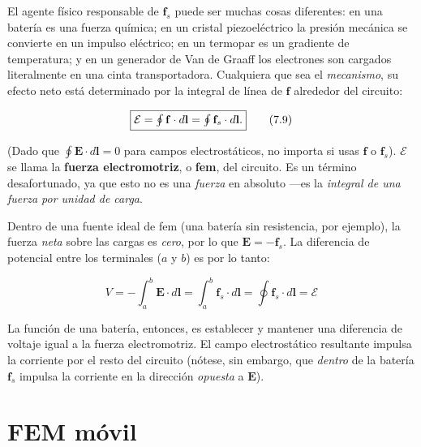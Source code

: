 \documentclass[12pt,a4paper]{report}
\newcommand{\esp}{\vspace{0.5cm}}
\begin{document}
	\esp
	
	El agente físico responsable de $\mathbf{f}_s$ puede ser muchas cosas diferentes: en una batería es una fuerza química; en un cristal piezoeléctrico la presión mecánica se convierte en un impulso eléctrico; en un termopar es un gradiente de temperatura; y en un generador de Van de Graaff los electrones son cargados literalmente en una cinta transportadora. Cualquiera que sea el \textit{mecanismo}, su efecto neto está determinado por la integral de línea de $\mathbf{f}$ alrededor del circuito:
	
	\esp
	
	\begin{equation}
		\fbox{$\mathcal{E} = \oint \mathbf{f} \cdot d\mathbf{l} = \oint \mathbf{f}_s \cdot d\mathbf{l}.$} \tag{7.9}
	\end{equation}
	
	\esp
	
	(Dado que $\oint \mathbf{E} \cdot d\mathbf{l} = 0$ para campos electrostáticos, no importa si usas $\mathbf{f}$ o $\mathbf{f}_s$). $\mathcal{E}$ se llama la \textbf{fuerza electromotriz}, o \textbf{fem}, del circuito. Es un término desafortunado, ya que esto no es una \textit{fuerza} en absoluto —es la \textit{integral de una fuerza por unidad de carga}.
	
	\esp
	
	Dentro de una fuente ideal de fem (una batería sin resistencia, por ejemplo), la fuerza \textit{neta} sobre las cargas es \textit{cero}, por lo que $\mathbf{E} = -\mathbf{f}_s$. La diferencia de potencial entre los terminales ($a$ y $b$) es por lo tanto:
	
	\esp
	
	\begin{equation}
		V = -\int_a^b \mathbf{E} \cdot d\mathbf{l} = \int_a^b \mathbf{f}_s \cdot d\mathbf{l} = \oint \mathbf{f}_s \cdot d\mathbf{l} = \mathcal{E} \tag{7.10}
	\end{equation}
	
	\esp
	
	La función de una batería, entonces, es establecer y mantener una diferencia de voltaje igual a la fuerza electromotriz. El campo electrostático resultante impulsa la corriente por el resto del circuito (nótese, sin embargo, que \textit{dentro} de la batería $\mathbf{f}_s$ impulsa la corriente en la dirección \textit{opuesta} a $\mathbf{E}$).
	
	\section{FEM móvil}
	
\end{document}
